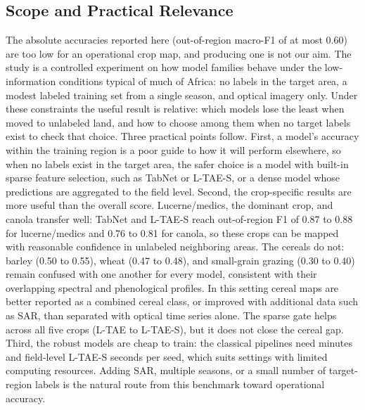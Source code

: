 \documentclass[preprint,authoryear]{elsarticle}
\begin{document}
\subsection{Scope and Practical Relevance}
The absolute accuracies reported here (out-of-region macro-F1 of at most 0.60) are too low for an operational crop map, and producing one is not our aim. The study is a controlled experiment on how model families behave under the low-information conditions typical of much of Africa: no labels in the target area, a modest labeled training set from a single season, and optical imagery only. Under these constraints the useful result is relative: which models lose the least when moved to unlabeled land, and how to choose among them when no target labels exist to check that choice. Three practical points follow. First, a model's accuracy within the training region is a poor guide to how it will perform elsewhere, so when no labels exist in the target area, the safer choice is a model with built-in sparse feature selection, such as TabNet or L-TAE-S, or a dense model whose predictions are aggregated to the field level. Second, the crop-specific results are more useful than the overall score. Lucerne/medics, the dominant crop, and canola transfer well: TabNet and L-TAE-S reach out-of-region F1 of 0.87 to 0.88 for lucerne/medics and 0.76 to 0.81 for canola, so these crops can be mapped with reasonable confidence in unlabeled neighboring areas. The cereals do not: barley (0.50 to 0.55), wheat (0.47 to 0.48), and small-grain grazing (0.30 to 0.40) remain confused with one another for every model, consistent with their overlapping spectral and phenological profiles. In this setting cereal maps are better reported as a combined cereal class, or improved with additional data such as SAR, than separated with optical time series alone. The sparse gate helps across all five crops (L-TAE to L-TAE-S), but it does not close the cereal gap. Third, the robust models are cheap to train: the classical pipelines need minutes and field-level L-TAE-S seconds per seed, which suits settings with limited computing resources. Adding SAR, multiple seasons, or a small number of target-region labels is the natural route from this benchmark toward operational accuracy.
\end{document}
